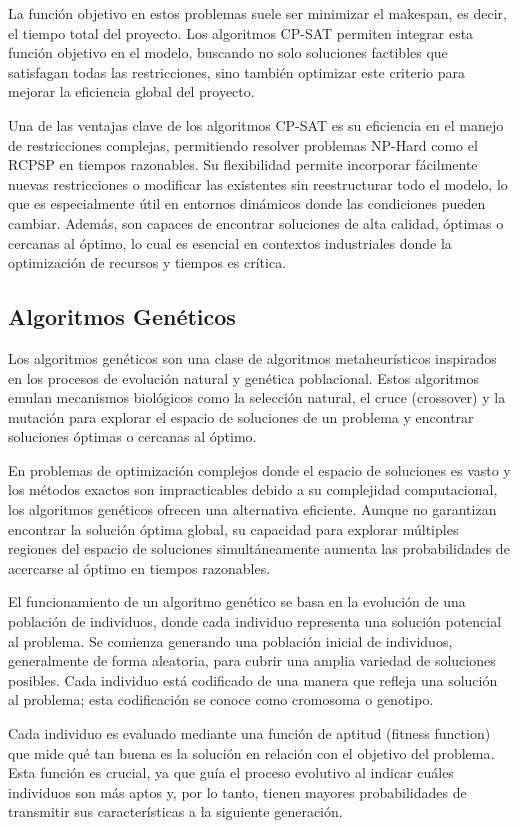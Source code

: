 \documentclass{article}
\begin{document}
La función objetivo en estos problemas suele ser minimizar el makespan, es decir, el tiempo total del proyecto. Los algoritmos CP-SAT permiten integrar esta función objetivo en el modelo, buscando no solo soluciones factibles que satisfagan todas las restricciones, sino también optimizar este criterio para mejorar la eficiencia global del proyecto.

Una de las ventajas clave de los algoritmos CP-SAT es su eficiencia en el manejo de restricciones complejas, permitiendo resolver problemas NP-Hard como el RCPSP en tiempos razonables. Su flexibilidad permite incorporar fácilmente nuevas restricciones o modificar las existentes sin reestructurar todo el modelo, lo que es especialmente útil en entornos dinámicos donde las condiciones pueden cambiar. Además, son capaces de encontrar soluciones de alta calidad, óptimas o cercanas al óptimo, lo cual es esencial en contextos industriales donde la optimización de recursos y tiempos es crítica.

\subsection{Algoritmos Genéticos}
Los algoritmos genéticos son una clase de algoritmos metaheurísticos inspirados en los procesos de evolución natural y genética poblacional. Estos algoritmos emulan mecanismos biológicos como la selección natural, el cruce (crossover) y la mutación para explorar el espacio de soluciones de un problema y encontrar soluciones óptimas o cercanas al óptimo.

En problemas de optimización complejos donde el espacio de soluciones es vasto y los métodos exactos son impracticables debido a su complejidad computacional, los algoritmos genéticos ofrecen una alternativa eficiente. Aunque no garantizan encontrar la solución óptima global, su capacidad para explorar múltiples regiones del espacio de soluciones simultáneamente aumenta las probabilidades de acercarse al óptimo en tiempos razonables.

El funcionamiento de un algoritmo genético se basa en la evolución de una población de individuos, donde cada individuo representa una solución potencial al problema. Se comienza generando una población inicial de individuos, generalmente de forma aleatoria, para cubrir una amplia variedad de soluciones posibles. Cada individuo está codificado de una manera que refleja una solución al problema; esta codificación se conoce como cromosoma o genotipo.

Cada individuo es evaluado mediante una función de aptitud (fitness function) que mide qué tan buena es la solución en relación con el objetivo del problema. Esta función es crucial, ya que guía el proceso evolutivo al indicar cuáles individuos son más aptos y, por lo tanto, tienen mayores probabilidades de transmitir sus características a la siguiente generación.
\end{document}
